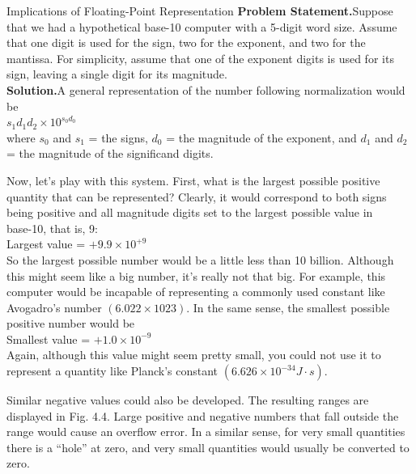 \documentclass[../main.tex]{subfiles}
\begin{document}
\begin{example} Implications of Floating-Point Representation
    \bigskip
    \newline
    \textbf{Problem Statement.}\quad Suppose that we had a hypothetical base-10 computer with a 5-digit
    word size. Assume that one digit is used for the sign, two for the exponent, and two for the
    mantissa. For simplicity, assume that one of the exponent digits is used for its sign, leaving
    a single digit for its magnitude.\\

    \noindent
    \textbf{Solution.}\quad A general representation of the number following normalization would be\\

    $s_1 d_1 d_2 \times 10^{s_0 d_0}$\\

    \noindent
    where $s_0$ and $s_1$ = the signs, $d_0$ = the magnitude of the exponent, and $d_1$ and $d_2$ = the magnitude
    of the significand digits.

    Now, let's play with this system. First, what is the largest possible positive quantity
    that can be represented? Clearly, it would correspond to both signs being positive and all
    magnitude digits set to the largest possible value in \\base-10, that is, 9:\\

    Largest value = $+9.9\times10^{+9}$\\

    \noindent
    So the largest possible number would be a little less than 10 billion. Although this might
    seem like a big number, it's really not that big. For example, this computer would be incapable
    of representing a commonly used constant like Avogadro's number $(6.022 \times 1023)$.
    In the same sense, the smallest possible positive number would be\\

    Smallest value = $+1.0 \times 10^{-9}$\\

    \noindent
    Again, although this value might seem pretty small, you could not use it to represent a
    quantity like Planck's constant $(6.626 \times 10^{-34} J \cdot s)$.
    
    Similar negative values could also be developed. The resulting ranges are displayed in
    Fig. 4.4. Large positive and negative numbers that fall outside the range would cause an
    overflow error. In a similar sense, for very small quantities there is a ``hole'' at zero, and
    very small quantities would usually be converted to zero.
    

\end{example}
\end{document}
